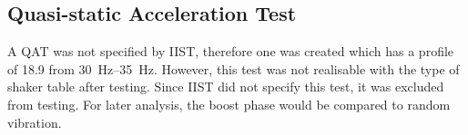 \documentclass{report}
\begin{document}



\subsection{Quasi-static Acceleration Test}

A QAT was not specified by IIST, therefore one was created which has a profile of \SI{18.9}{\gacc} from \SIrange{30}{35}{\hertz}. However, this test was not realisable with the type of shaker table after testing. Since IIST did not specify this test, it was excluded from testing. For later analysis, the boost phase would be compared to random vibration.
\end{document}

